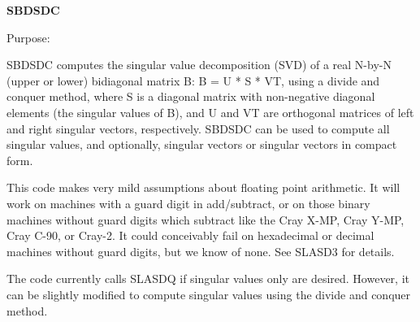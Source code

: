 {\bfseries S\+B\+D\+S\+D\+C} 

 \begin{DoxyParagraph}{Purpose\+: }
\begin{DoxyVerb} SBDSDC computes the singular value decomposition (SVD) of a real
 N-by-N (upper or lower) bidiagonal matrix B:  B = U * S * VT,
 using a divide and conquer method, where S is a diagonal matrix
 with non-negative diagonal elements (the singular values of B), and
 U and VT are orthogonal matrices of left and right singular vectors,
 respectively. SBDSDC can be used to compute all singular values,
 and optionally, singular vectors or singular vectors in compact form.

 This code makes very mild assumptions about floating point
 arithmetic. It will work on machines with a guard digit in
 add/subtract, or on those binary machines without guard digits
 which subtract like the Cray X-MP, Cray Y-MP, Cray C-90, or Cray-2.
 It could conceivably fail on hexadecimal or decimal machines
 without guard digits, but we know of none.  See SLASD3 for details.

 The code currently calls SLASDQ if singular values only are desired.
 However, it can be slightly modified to compute singular values
 using the divide and conquer method.\end{DoxyVerb}
 
\end{DoxyParagraph}

